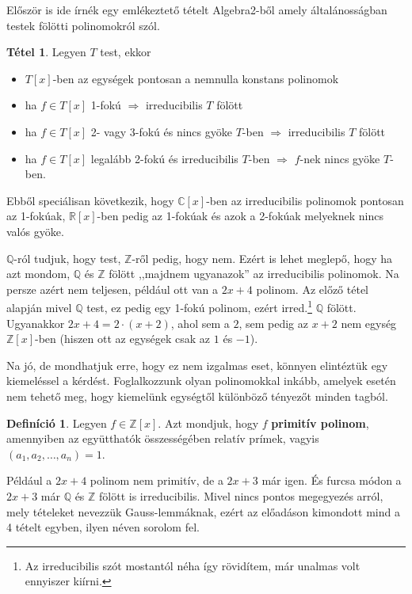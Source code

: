 \documentclass[12pt]{book}
\theoremstyle{plain} %
\theoremstyle{definition} %
\newtheorem{defi/}{Definíció}[section]
\newenvironment{defi}
  {\renewcommand{\qedsymbol}{$\clubsuit$}%
   \pushQED{\qed}\begin{defi/}}
  {\popQED\end{defi/}}
\newtheorem{theo/}{Tétel}[section]
\newenvironment{theo}
  {\renewcommand{\qedsymbol}{$\clubsuit$}%
   \pushQED{\qed}\begin{theo/}}
  {\popQED\end{theo/}}
\theoremstyle{remark}
\renewcommand\qedsymbol{$\blacksquare$}
\numberwithin{equation}{section}  %
\begin{document}
	Először is ide írnék egy emlékeztető tételt Algebra2-ből amely általánosságban testek fölötti polinomokról szól.
	\begin{theo}\label{testirred}
		Legyen $T$ test, ekkor
		\begin{itemize}
			\item $T[x]$-ben az egységek pontosan a nemnulla konstans polinomok
			\item ha $f\in T[x]$ 1-fokú $\Rightarrow$ irreducibilis $T$ fölött
			\item ha $f\in T[x]$ 2- vagy 3-fokú és nincs gyöke $T$-ben $\Rightarrow$ irreducibilis $T$ fölött
			\item ha $f\in T[x]$ legalább 2-fokú és irreducibilis $T$-ben $\Rightarrow$ $f$-nek nincs gyöke $T$-ben.
		\end{itemize}
	\end{theo}

	Ebből speciálisan következik, hogy $\mathbb{C}[x]$-ben az irreducibilis polinomok pontosan az 1-fokúak, $\mathbb{R}[x]$-ben pedig az 1-fokúak és azok a 2-fokúak melyeknek nincs valós gyöke.
	
	$\mathbb{Q}$-ról tudjuk, hogy test, $\mathbb{Z}$-ről pedig, hogy nem. Ezért is lehet meglepő, hogy ha azt mondom, $\mathbb{Q}$ és $\mathbb{Z}$ fölött ,,majdnem ugyanazok'' az irreducibilis polinomok. Na persze azért nem teljesen, például ott van a $2x+4$ polinom. Az előző tétel alapján mivel $\mathbb{Q}$ test, ez pedig egy 1-fokú polinom, ezért irred.\footnote{Az irreducibilis szót mostantól néha így rövidítem, már unalmas volt ennyiszer kiírni.} $\mathbb{Q}$ fölött. Ugyanakkor $2x+4 = 2\cdot (x+2)$, ahol sem a $2$, sem pedig az $x+2$ nem egység $\mathbb{Z}[x]$-ben (hiszen ott az egységek csak az $1$ és $-1$).
	
	Na jó, de mondhatjuk erre, hogy ez nem izgalmas eset, könnyen elintéztük egy kiemeléssel a kérdést. Foglalkozzunk olyan polinomokkal inkább, amelyek esetén nem tehető meg, hogy kiemelünk egységtől különböző tényezőt minden tagból.
	
	\begin{defi}
		Legyen $f\in \mathbb{Z}[x]$. Azt mondjuk, hogy $f$ \textbf{primitív polinom}, amennyiben az együtthatók összességében relatív prímek, vagyis $(a_1,a_2,\ldots,a_n)=1$.
	\end{defi}
	
	Például a $2x+4$ polinom nem primitív, de a $2x+3$ már igen. És furcsa módon a $2x+3$ már $\mathbb{Q}$ és $\mathbb{Z}$ fölött is irreducibilis. Mivel nincs pontos megegyezés arról, mely tételeket nevezzük Gauss-lemmáknak, ezért az előadáson kimondott mind a 4 tételt egyben, ilyen néven sorolom fel.
	
\end{document}
